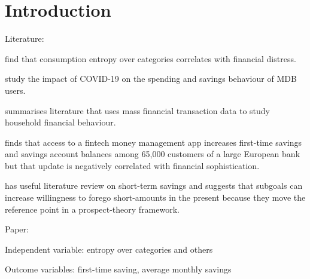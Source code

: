 
\section{Introduction}%
\label{sec:introduction}

Literature:

\citet{muggleton2020evidence} find that consumption entropy over categories
correlates with financial distress.

\citet{davenport2020spending} study the impact of COVID-19 on the spending and
savings behaviour of MDB users.

\citet{baker2021household} summarises literature that uses mass financial
transaction data to study household financial behaviour.

\citet{becker2017does} finds that access to a fintech money management app
increases first-time savings and savings account balances among 65,000 customers
of a large European bank but that update is negatively correlated with financial
sophistication.

\citet{colby2013savings} has useful literature review on short-term savings and
suggests that subgoals can increase willingness to forego short-amounts in the
present because they move the reference point in a prospect-theory framework.

Paper:

Independent variable: entropy over categories and others

Outcome variables: first-time saving, average monthly savings
